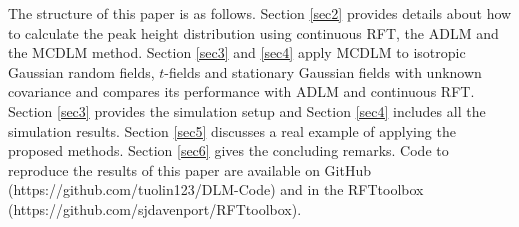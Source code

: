\documentclass{article}
\begin{document}

The structure of this paper is as follows. Section \ref{sec2} provides details about how to calculate the peak height distribution using continuous RFT, the ADLM and the MCDLM method. Section \ref{sec3} and \ref{sec4} apply MCDLM to isotropic Gaussian random fields, $t$-fields and stationary Gaussian fields with unknown covariance and compares its performance with ADLM and continuous RFT. Section \ref{sec3} provides the simulation setup and Section \ref{sec4} includes all the simulation results. Section \ref{sec5} discusses a real example of applying the proposed methods. Section \ref{sec6} gives the concluding remarks. Code to reproduce the results of this paper are available on GitHub (https://github.com/tuolin123/DLM-Code) and in the RFTtoolbox (https://github.com/sjdavenport/RFTtoolbox).




\end{document}

